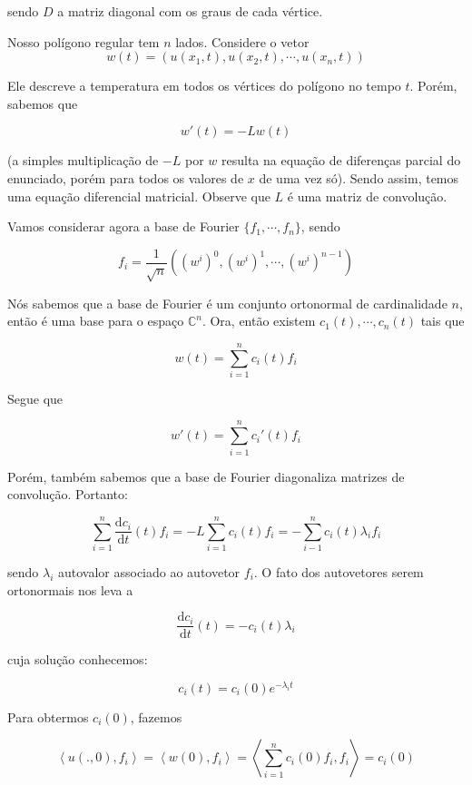 \documentclass{article}
\begin{document}
\begin{enumerate}
                sendo $D$ a matriz diagonal com os graus de cada vértice.

                Nosso polígono regular tem $n$ lados. Considere o vetor $$w(t) = (u(x_1, t), u(x_2, t), \cdots, u(x_n, t))$$

                Ele descreve a temperatura em todos os vértices do polígono no tempo $t$.
                Porém, sabemos que

                $$w'(t) = -L w(t)$$

                (a simples multiplicação de $-L$ por $w$ resulta na equação de diferenças parcial do enunciado,
                porém para todos os valores de $x$ de uma vez só).
                Sendo assim, temos uma equação diferencial matricial.
                Observe que $L$ é uma matriz de convolução.
                
                Vamos considerar agora a base de Fourier $\{f_1, \cdots, f_n\}$, sendo

                $$f_i = \dfrac{1}{\sqrt{n}} \left((w^i)^0, (w^i)^1, \cdots, (w^i)^{n-1}\right)$$

                Nós sabemos que a base de Fourier é um conjunto ortonormal de cardinalidade $n$, então é uma base para o espaço
                $\mathbb{C}^n$. Ora, então existem $c_1(t), \cdots, c_n(t)$ tais que

                $$w(t) = \sum_{i=1}^n c_i(t)f_i$$

                Segue que

                $$w'(t) = \sum_{i=1}^n c_i'(t)f_i$$

                Porém, também sabemos que a base de Fourier diagonaliza matrizes de convolução. Portanto:

                $$\sum_{i=1}^n \dfrac{\mathrm{d}c_i}{\mathrm{d}t}(t)f_i = -L\sum_{i=1}^nc_i(t)f_i = -\sum_{i-1}^n c_i(t)\lambda_if_i$$

                sendo $\lambda_i$ autovalor associado ao autovetor $f_i$.
                O fato dos autovetores serem ortonormais nos leva a

                $$\dfrac{\mathrm{d}c_i}{\mathrm{d}t}(t) = -c_i(t)\lambda_i$$

                cuja solução conhecemos:

                $$c_i(t) = c_i(0) e^{-\lambda_i t}$$

                Para obtermos $c_i(0)$, fazemos

                $$\left<u(., 0), f_i\right> = \left<w(0), f_i\right> = \left<\sum_{i=1}^n c_i(0)f_i, f_i\right> = c_i(0)$$


\end{enumerate}
\end{document}
